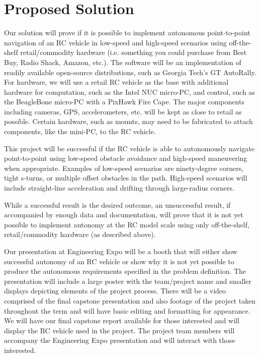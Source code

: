 \documentclass[draftclsnofoot,onecolumn,10pt]{IEEEtran}
\begin{document}
\section{Proposed Solution}
Our solution will prove if it is possible to implement autonomous point-to-point
navigation of an RC vehicle in low-speed and high-speed scenarios using
off-the-shelf retail/commodity hardware (i.e. something you could purchase from
Best Buy, Radio Shack, Amazon, etc.).  The software will be an implementation of
readily available open-source distributions, such as Georgia Tech's GT
AutoRally. For hardware, we will use a retail RC vehicle as the base with
additional hardware for computation, such as the Intel NUC micro-PC, and
control, such as the BeagleBone micro-PC with a PixHawk Fire Cape. The major 
components including cameras, GPS, accelerometers, etc. will be kept as close 
to retail as possible. Certain hardware, such as mounts, may need to be fabricated 
to attach components, like the mini-PC, to the RC vehicle.\par
This project will be successful if the RC vehicle is able to autonomously
navigate point-to-point using low-speed obstacle avoidance and high-speed
maneuvering when appropriate. Examples of low-speed scenarios are ninety-degree
corners, tight s-turns, or multiple offset obstacles in the path. High-speed
scenarios will include straight-line acceleration and drifting through
large-radius corners.\par
While a successful result is the desired outcome, an unsuccessful result, if 
accompanied by enough data and documentation, will prove that it is not yet 
possible to implement autonomy at the RC model scale using only off-the-shelf, 
retail/commodity hardware (as described above).\par
Our presentation at Engineering Expo will be a booth that will either show successful
autonomy of an RC vehicle or show why it is not yet possible to produce the
autonomous requirements specified in the problem definition. The presentation
will include a large poster with the team/project name and smaller displays
depicting elements of the project process. There will be a video comprised of the
final capstone presentation and also footage of the project taken throughout
the term and will have basic editing and formatting for appearance. We will have
our final capstone report available for those interested and will display the RC
vehicle used in the project. The project team members will accompany the Engineering Expo
presentation and will interact with those interested.
\end{document}
